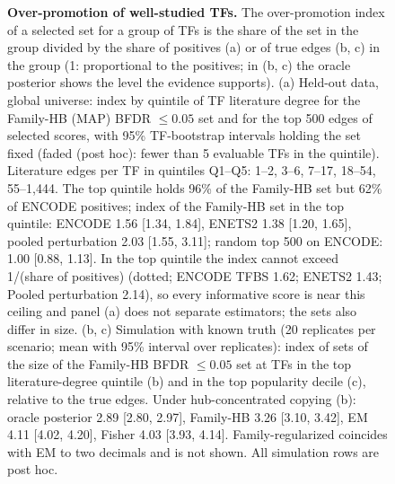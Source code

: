 \documentclass[11pt,a4paper]{article}
\begin{document}
\begin{figure}[tbp]
  \caption{\textbf{Over-promotion of well-studied TFs.} The over-promotion index of a selected set for a group of TFs is the share of the set in the group divided by the share of positives (a) or of true edges (b, c) in the group (1: proportional to the positives; in (b, c) the oracle posterior shows the level the evidence supports). (a) Held-out data, global universe: index by quintile of TF literature degree for the Family-HB (MAP) BFDR $\leq 0.05$ set and for the top 500 edges of selected scores, with 95\% TF-bootstrap intervals holding the set fixed (faded (post hoc): fewer than 5 evaluable TFs in the quintile). Literature edges per TF in quintiles Q1--Q5: 1--2, 3--6, 7--17, 18--54, 55--1{,}444. The top quintile holds 96\% of the Family-HB set but 62\% of ENCODE positives; index of the Family-HB set in the top quintile: ENCODE 1.56 [1.34, 1.84], ENETS2 1.38 [1.20, 1.65], pooled perturbation 2.03 [1.55, 3.11]; random top 500 on ENCODE: 1.00 [0.88, 1.13]. In the top quintile the index cannot exceed 1/(share of positives) (dotted; ENCODE TFBS 1.62; ENETS2 1.43; Pooled perturbation 2.14), so every informative score is near this ceiling and panel (a) does not separate estimators; the sets also differ in size. (b, c) Simulation with known truth (20 replicates per scenario; mean with 95\% interval over replicates): index of sets of the size of the Family-HB BFDR $\leq 0.05$ set at TFs in the top literature-degree quintile (b) and in the top popularity decile (c), relative to the true edges. Under hub-concentrated copying (b): oracle posterior 2.89 [2.80, 2.97], Family-HB 3.26 [3.10, 3.42], EM 4.11 [4.02, 4.20], Fisher 4.03 [3.93, 4.14]. Family-regularized coincides with EM to two decimals and is not shown. All simulation rows are post hoc.}
  \label{fig:hubs}
\end{figure}
\end{document}
